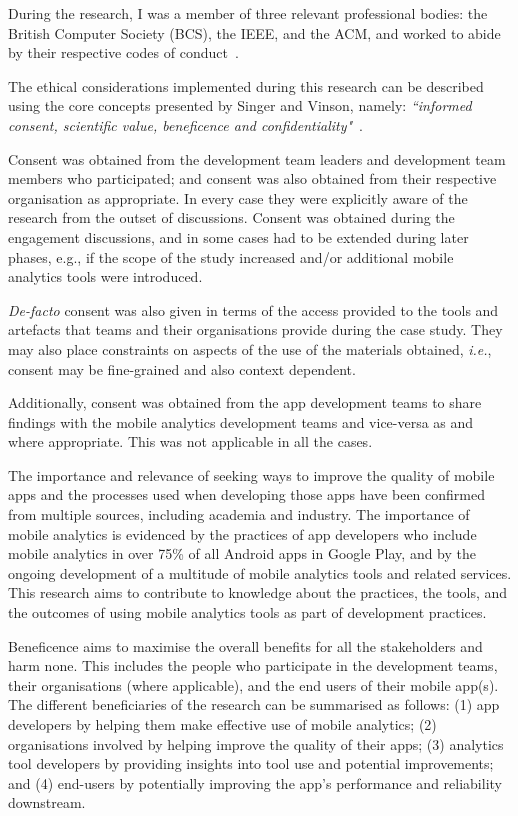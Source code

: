 During the research, I was a member of three relevant professional bodies: the British Computer Society (BCS), the IEEE, and the ACM, and worked to abide by their respective codes of conduct~.

The ethical considerations implemented during this research can be described using the core concepts presented by Singer and Vinson, namely: \emph{``informed consent, scientific value, beneficence and confidentiality"}~. 

Consent was obtained from the development team leaders and development team members who participated; and consent was also obtained from their respective organisation as appropriate. In every case they were explicitly aware of the research from the outset of discussions.  Consent was obtained during the engagement discussions, and in some cases had to be extended during later phases, e.g., if the scope of the study increased and/or additional mobile analytics tools were introduced.

\emph{De-facto} consent was also given in terms of the access provided to the tools and artefacts that teams and their organisations provide during the case study. They may also place constraints on aspects of the use of the materials obtained, \emph{i.e.}, consent may be fine-grained and also context dependent.

Additionally, consent was obtained from the app development teams to share findings with the mobile analytics development teams and vice-versa as and where appropriate. This was not applicable in all the cases.

The importance and relevance of seeking ways to improve the quality of mobile apps and the processes used when developing those apps have been confirmed from multiple sources, including academia and industry. The importance of mobile analytics is evidenced by the practices of app developers who include mobile analytics in over 75\% of all Android apps in Google Play, and by the ongoing development of a multitude of mobile analytics tools and related services. This research aims to contribute to knowledge about the practices, the tools, and the outcomes of using mobile analytics tools as part of development practices. 

Beneficence aims to maximise the overall benefits for all the stakeholders and harm none. This includes the people who participate in the development teams, their organisations (where applicable), and the end users of their mobile app(s).  The different beneficiaries of the research can be summarised as follows: (1) app developers by helping them make effective use of mobile analytics; (2) organisations involved by helping improve the quality of their apps; (3) analytics tool developers by providing insights into tool use and potential improvements; and (4) end-users by potentially improving the app's performance and reliability downstream.

